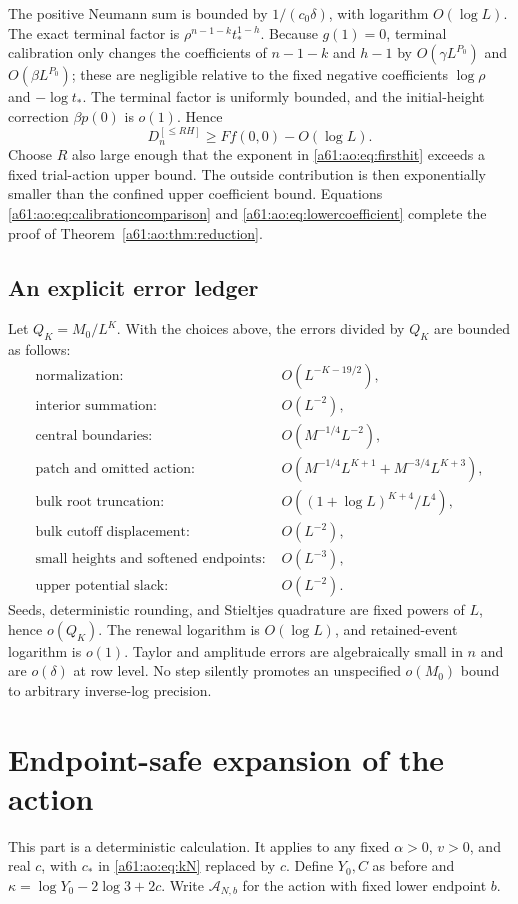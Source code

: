 \documentclass[11pt,letterpaper]{article}
\numberwithin{equation}{section}
\theoremstyle{remark}\newtheorem{remark}[theorem]{Remark}
\newcommand{\A}{\mathcal A}
\begin{document}
The positive Neumann sum is bounded by $1/(c_0\delta)$, with
logarithm $O(\log L)$. The exact terminal factor is
$\rho^{n-1-k}t_*^{1-h}$. Because $g(1)=0$, terminal calibration only
changes the coefficients of $n-1-k$ and $h-1$ by
$O(\gamma L^{P_0})$ and $O(\beta L^{P_0})$; these are negligible
relative to the fixed negative coefficients $\log\rho$ and
$-\log t_*$. The terminal factor is uniformly bounded, and the
initial-height correction $\beta p(0)$ is $o(1)$. Hence
\[
 D_n^{[\le RH]}\ge Ff(0,0)-O(\log L).
\]
Choose $R$ also large enough that the exponent in
\eqref{a61:ao:eq:firsthit} exceeds a fixed trial-action upper bound.
The outside contribution is then exponentially smaller than the
confined upper coefficient bound. Equations
\eqref{a61:ao:eq:calibrationcomparison} and \eqref{a61:ao:eq:lowercoefficient}
complete the proof of Theorem~\ref{a61:ao:thm:reduction}.

\subsection{An explicit error ledger}
Let $Q_K=M_0/L^K$. With the choices above, the errors divided by
$Q_K$ are bounded as follows:
\begin{align*}
 \text{normalization: }&O(L^{-K-19/2}),\\
 \text{interior summation: }&O(L^{-2}),\\
 \text{central boundaries: }&O(M^{-1/4}L^{-2}),\\
 \text{patch and omitted action: }&
 O(M^{-1/4}L^{K+1}+M^{-3/4}L^{K+3}),\\
 \text{bulk root truncation: }&O((1+\log L)^{K+4}/L^4),\\
 \text{bulk cutoff displacement: }&O(L^{-2}),\\
 \text{small heights and softened endpoints: }&O(L^{-3}),\\
 \text{upper potential slack: }&O(L^{-2}).
\end{align*}
Seeds, deterministic rounding, and Stieltjes quadrature are fixed
powers of $L$, hence $o(Q_K)$. The renewal logarithm is $O(\log L)$,
and retained-event logarithm is $o(1)$. Taylor and amplitude errors
are algebraically small in $n$ and are $o(\delta)$ at row level.
No step silently promotes an unspecified $o(M_0)$ bound to arbitrary
inverse-log precision.


\section{Endpoint-safe expansion of the action}\label{a61:ao:sec:action}
This part is a deterministic calculation. It applies to any fixed
$\alpha>0$, $v>0$, and real $c$, with $c_*$ in \eqref{a61:ao:eq:kN}
replaced by $c$. Define $Y_0,C$ as before and
$\kappa=\log Y_0-2\log3+2c$. Write $\A_{N,b}$ for the action
with fixed lower endpoint $b$.
\end{document}
